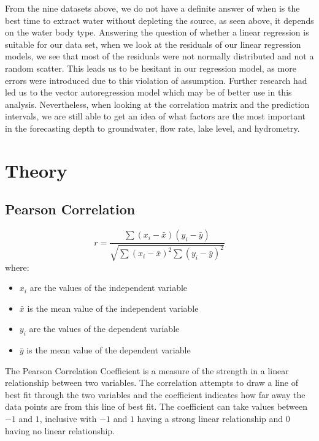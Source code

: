 \documentclass[12pt, letterpaper]{article}
\begin{document}
From the nine datasets above, we do not have a definite answer of when is the best time to extract water without depleting the source, as seen above, it depends on the water body type. Answering the question of whether a linear regression is suitable for our data set, when we look at the residuals of our linear regression models, we see that most of the residuals were not normally distributed and not a random scatter. This leads us to be hesitant in our regression model, as more errors were introduced due to this violation of assumption. Further research had led us to the vector autoregression model which may be of better use in this analysis. Nevertheless, when looking at the correlation matrix and the prediction intervals, we are still able to get an idea of what factors are the most important in the forecasting depth to groundwater, flow rate, lake level, and hydrometry. 


\section{Theory}
\subsection{Pearson Correlation}
$$r = \frac{\sum(x_i - \bar{x})(y_i-\bar{y})}{\sqrt{\sum{(x_i-\bar{x})^2}\sum{(y_i-\bar{y})^2}}}$$
where: \begin{itemize}
    \item $x_i$ are the values of the independent variable
    \item $\bar{x}$ is the mean value of the independent variable
    \item $y_i$ are the values of the dependent variable 
    \item $\bar{y}$ is the mean value of the dependent variable
\end{itemize}
The Pearson Correlation Coefficient is a measure of the strength in a linear relationship between two variables. The correlation attempts to draw a line of best fit through the two variables and the coefficient indicates how far away the data points are from this line of best fit. The coefficient can take values between $-1$ and $1$, inclusive with $-1$ and $1$ having a strong linear relationship and $0$ having no linear relationship.
\end{document}
